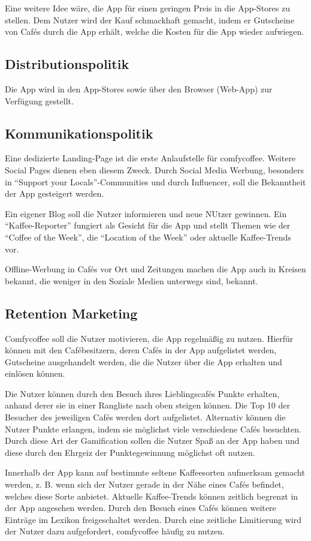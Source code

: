 Eine weitere Idee wäre, die App für einen geringen Preis in die App-Stores zu stellen. Dem Nutzer wird der Kauf schmackhaft gemacht, indem er Gutscheine von Cafés durch die App erhält, welche die Kosten für die App wieder aufwiegen.

\subsection{Distributionspolitik}
Die App wird in den App-Stores sowie über den Browser (Web-App) zur Verfügung gestellt.

\subsection{Kommunikationspolitik}
Eine dedizierte Landing-Page ist die erste Anlaufstelle für comfycoffee. Weitere Social Pages dienen eben diesem Zweck. Durch Social Media Werbung, besonders in ``Support your Locals''-Communities und durch Influencer, soll die Bekanntheit der App gesteigert werden.

Ein eigener Blog soll die Nutzer informieren und neue NUtzer gewinnen. Ein ``Kaffee-Reporter'' fungiert als Gesicht für die App und stellt Themen wie der ``Coffee of the Week'', die ``Location of the Week'' oder aktuelle Kaffee-Trends vor.

Offline-Werbung in Cafés vor Ort und Zeitungen machen die App auch in Kreisen bekannt, die weniger in den Soziale Medien unterwegs sind, bekannt.

\subsection{Retention Marketing}
Comfycoffee soll die Nutzer motivieren, die App regelmäßig zu nutzen. Hierfür können mit den Cafébesitzern, deren Cafés in der App aufgelistet werden, Gutscheine ausgehandelt werden, die die Nutzer über die App erhalten und einlösen können.

Die Nutzer können durch den Besuch ihres Lieblingscafés Punkte erhalten, anhand derer sie in einer Rangliste nach oben steigen können. Die Top 10 der Besucher des jeweiligen Cafés werden dort aufgelistet. Alternativ können die Nutzer Punkte erlangen, indem sie möglichst viele verschiedene Cafés besuchten. Durch diese Art der Gamification sollen die Nutzer Spaß an der App haben und diese durch den Ehrgeiz der Punktegewinnung möglichst oft nutzen.

Innerhalb der App kann auf bestimmte seltene Kaffeesorten aufmerksam gemacht werden, z. B. wenn sich der Nutzer gerade in der Nähe eines Cafés befindet, welches diese Sorte anbietet. Aktuelle Kaffee-Trends können zeitlich begrenzt in der App angesehen werden. Durch den Besuch eines Cafés können weitere Einträge im Lexikon freigeschaltet werden. Durch eine zeitliche Limitierung wird der Nutzer dazu aufgefordert, comfycoffee häufig zu nutzen.

